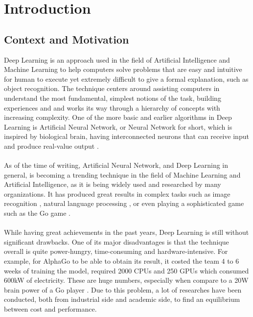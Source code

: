\chapter{Introduction}

\section{Context and Motivation}

Deep Learning is an approach used in the field of Artificial Intelligence and Machine Learning to help computers solve problems that are easy and intuitive for human to execute yet extremely difficult to give a formal explanation, such as object recognition. The technique centers around assisting computers in understand the most fundamental, simplest notions of the task, building experiences and and works its way through a hierarchy of concepts with increasing complexity. One of the more basic and earlier algorithms in Deep Learning is Artificial Neural Network, or Neural Network for short, which is inspired by biological brain, having interconnected neurons that can receive input and produce real-value output \cite{Goodfellow-et-al-2016}. \\
~\\
As of the time of writing, Artificial Neural Network, and Deep Learning in general, is becoming a trending technique in the field of Machine Learning and Artificial Intelligence, as it is being widely used and researched by many organizations. It has produced great results in complex tasks such as image recognition \cite{Krizhevsky:2012:ICD:2999134.2999257}, natural language processing \cite{recent-advances-in-deep-learning-for-speech-research-at-microsoft}, or even playing a sophisticated game such as the Go game \cite{GoGame}. \\ 
~\\
While having great achievements in the past years, Deep Learning is still without significant drawbacks. One of its major disadvantages is that the technique overall is quite power-hungry, time-consuming and hardware-intensive. For example, for AlphaGo to be able to obtain its result, it costed the team 4 to 6 weeks of training the model, required 2000 CPUs and 250 GPUs which consumed 600kW of electricity. These are huge numbers, especially when compare to a 20W brain power of a Go player \cite{GoGame}. Due to this problem, a lot of researches have been conducted, both from industrial side and academic side, to find an equilibrium between cost and performance. \\
